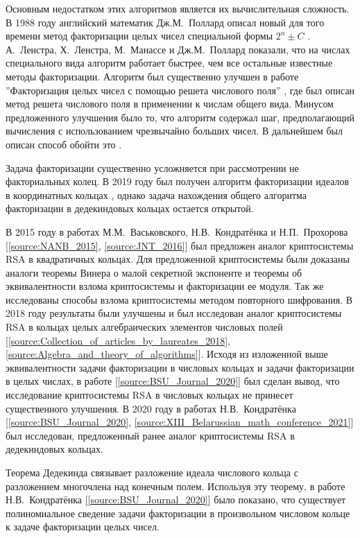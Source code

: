 \documentclass[_00_dissertation.tex]{subfiles}
\begin{document}
Основным недостатком этих алгоритмов является их вычислительная сложность.
В 1988 году английский математик Дж.М.~Поллард описал новый для того времени метод факторизации целых чисел специальной формы $2^n \pm C$ \cite{source:Pollard}.
А.~Ленстра, Х.~Ленстра, М.~Манассе и Дж.М.~Поллард показали, что на числах специального вида алгоритм работает быстрее, чем все остальные известные методы факторизации.
Алгоритм был существенно улучшен в работе ''Факторизация целых чисел с помощью решета числового поля'' \cite{source:Buhler}, где был описан метод решета числового поля в применении к числам общего вида.
Минусом предложенного улучшения было то, что алгоритм содержал шаг, предполагающий вычисления с использованием чрезвычайно больших чисел.
В дальнейшем был описан способ обойти это \cite{source:Couveignes}.

Задача факторизации существенно усложняется при рассмотрении не факториальных колец.
В 2019 году был получен алгоритм факторизации идеалов в координатных кольцах \cite{source:Darkey-Mensah}, однако задача нахождения общего алгоритма факторизации в дедекиндовых кольцах остается открытой.

В 2015 году в работах М.М.~Васьковского, Н.В.~Кондратёнка и Н.П.~Прохорова [\ref{source:NANB_2015}, \ref{source:JNT_2016}] был предложен аналог криптосистемы RSA в квадратичных кольцах.
Для предложенной криптосистемы были доказаны аналоги теоремы Винера о малой секретной экспоненте и теоремы об эквивалентности взлома криптосистемы и факторизации ее модуля.
Так же исследованы способы взлома криптосистемы методом повторного шифрования.
В 2018 году результаты были улучшены и был исследован аналог криптосистемы RSA в кольцах целых алгебраических элементов числовых полей [\ref{source:Collection_of_articles_by_laureates_2018}, \ref{source:Algebra_and_theory_of_algorithms}].
Исходя из изложенной выше эквивалентности задачи факторизации в числовых кольцах и задачи факторизации в целых числах, в работе [\ref{source:BSU_Journal_2020}] был сделан вывод, что исследование криптосистемы RSA в числовых кольцах не принесет существенного улучшения.
В 2020 году в работах Н.В.~Кондратёнка [\ref{source:BSU_Journal_2020}, \ref{source:XIII_Belarussian_math_conference_2021}] был исследован, предложенный ранее аналог криптосистемы RSA в дедекиндовых кольцах.

Теорема Дедекинда связывает разложение идеала числового кольца с разложением многочлена над конечным полем.
Используя эту теорему, в работе Н.В.~Кондратёнка [\ref{source:BSU_Journal_2020}] было показано, что существует полиномиальное сведение задачи факторизации в произвольном числовом кольце к задаче факторизации целых чисел.
\end{document}
